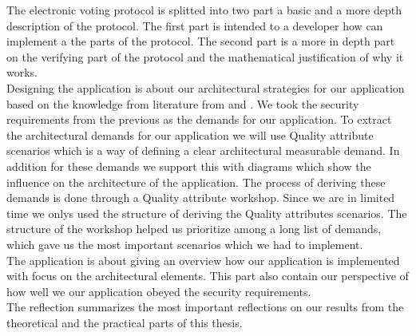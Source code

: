 \noindent
The electronic voting protocol is splitted into two part a basic and a more depth description of the protocol. The first part is intended to a developer how can implement a the parts of the protocol. The second part is a more in depth part on the verifying part of the protocol and the mathematical justification of why it works. \\   


\noindent
Designing the application is about our architectural strategies for our application based on the knowledge from literature from \cite{Bass} and \cite{Baerbak10}. We took the security requirements from the previous as the demands for our application. To extract the architectural demands for our application we will use Quality attribute scenarios which is a way of defining a clear architectural measurable demand. In addition for these demands we support this with diagrams which show the influence on the architecture of the application. The process of deriving these demands is done through a Quality attribute workshop. Since we are in  limited  time we onlys used the structure of deriving the Quality attributes scenarios. The structure of the workshop helped us prioritize among a long list of demands, which gave us the most important scenarios which we had to implement.\\


\noindent
The application is about giving an overview how our application is implemented with focus on the architectural elements. This part also contain our perspective of how well we our application obeyed the security requirements. \\


\noindent
The reflection summarizes the most important reflections on our results from the theoretical and the practical parts of this thesis. 



  


 